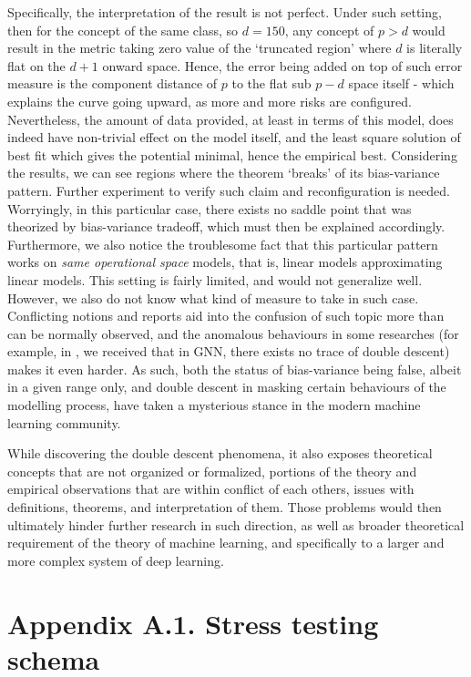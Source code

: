\documentclass[10pt]{article} %
\begin{document}
Specifically, the interpretation of the result is not perfect. Under such setting, then for the concept of the same class, so $d=150$, any concept of $p>d$ would result in the metric taking zero value of the `truncated region' where $d$ is literally flat on the $d+1$ onward space. Hence, the error being added on top of such error measure is the component distance of $p$ to the flat sub $p-d$ space itself - which explains the curve going upward, as more and more risks are configured. Nevertheless, the amount of data provided, at least in terms of this model, does indeed have non-trivial effect on the model itself, and the least square solution of best fit which gives the potential minimal, hence the empirical best. Considering the results, we can see regions where the theorem `breaks' of its bias-variance pattern. Further experiment to verify such claim and reconfiguration is needed. Worryingly, in this particular case, there exists no saddle point that was theorized by bias-variance tradeoff, which must then be explained accordingly. Furthermore, we also notice the troublesome fact that this particular pattern works on \textit{same operational space} models, that is, linear models approximating linear models. This setting is fairly limited, and would not generalize well. However, we also do not know what kind of measure to take in such case. Conflicting notions and reports aid into the confusion of such topic more than can be normally observed, and the anomalous behaviours in some researches (for example, in \cite{shi2024homophilymodulatesdoubledescent}, we received that in GNN, there exists no trace of double descent) makes it even harder. As such, both the status of bias-variance being false, albeit in a given range only, and double descent in masking certain behaviours of the modelling process, have taken a mysterious stance in the modern machine learning community.

While discovering the double descent phenomena, it also exposes theoretical concepts that are not organized or formalized, portions of the theory and empirical observations that are within conflict of each others, issues with definitions, theorems, and interpretation of them. Those problems would then ultimately hinder further research in such direction, as well as broader theoretical requirement of the theory of machine learning, and specifically to a larger and more complex system of deep learning. 

\section*{Appendix A.1. Stress testing schema}
\end{document}
